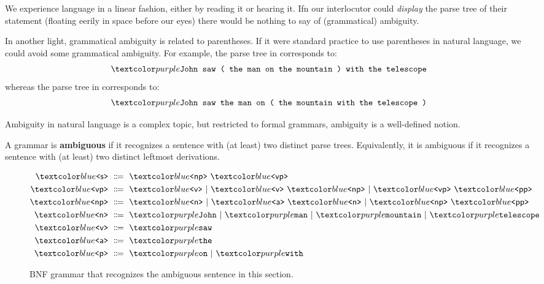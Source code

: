 \begin{remark}
  We experience language in a linear fashion, either by reading it or hearing it.
  Ifn our interlocutor could \textit{display} the parse tree of their statement (floating eerily in space before our eyes) there would be nothing to say of (grammatical) ambiguity.

  In another light, grammatical ambiguity is related to parentheses.
  If it were standard practice to use parentheses in natural language, we could avoid some grammatical ambiguity.
  For example, the parse tree in  corresponds to:
  \begin{align*}
    \bnft{John saw ( the man on the mountain ) with the telescope}
  \end{align*}
  whereas the parse tree in  corresponds to:
  \begin{align*}
    \bnft{John saw the man on ( the mountain with the telescope )}
  \end{align*}
\end{remark}
%
Ambiguity in natural language is a complex topic, but restricted to formal grammars, ambiguity is a well-defined notion.

\begin{definition}
  A grammar is \textbf{ambiguous} if it recognizes a sentence with (at least) two distinct parse trees.
  Equivalently, it is ambiguous if it recognizes a sentence with (at least) two distinct leftmost derivations.
\end{definition}

\begin{figure}
  \begin{align*}
    \bnfnt{s} &\bnfeq \bnfnt{np} \ \bnfnt{vp} \\
    \bnfnt{vp} &\bnfeq
    \bnfnt{v} \bnfalt
    \bnfnt{v} \ \bnfnt{np} \bnfalt
    \bnfnt{vp} \ \bnfnt{pp} \\
    \bnfnt{np} &\bnfeq
    \bnfnt{n} \bnfalt
    \bnfnt{a} \ \bnfnt{n} \bnfalt
    \bnfnt{np} \ \bnfnt{pp} \\
    \bnfnt{n} &\bnfeq
    \bnft{John} \bnfalt
    \bnft{man} \bnfalt
    \bnft{mountain} \bnfalt
    \bnft{telescope} \\
    \bnfnt{v} &\bnfeq \bnft{saw} \\
    \bnfnt{a} &\bnfeq \bnft{the} \\
    \bnfnt{p} &\bnfeq \bnft{on} \bnfalt \bnft{with}
  \end{align*}
  \caption{BNF grammar that recognizes the ambiguous sentence in this section.}
  \label{fig:john-grammar}
\end{figure}

